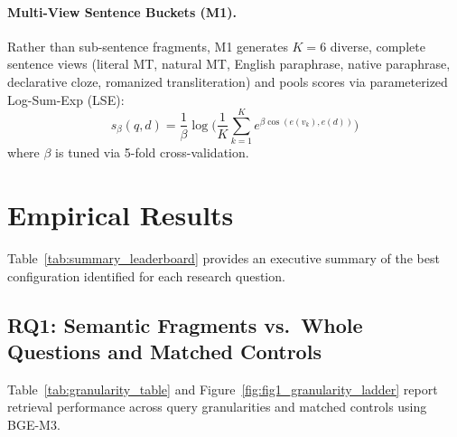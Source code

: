 \documentclass[11pt]{article}
\begin{document}
\paragraph{Multi-View Sentence Buckets (M1).} Rather than sub-sentence fragments, M1 generates $K=6$ diverse, complete sentence views (literal MT, natural MT, English paraphrase, native paraphrase, declarative cloze, romanized transliteration) and pools scores via parameterized Log-Sum-Exp (LSE):
\begin{equation}
s_\beta(q, d) = \frac{1}{\beta} \log \Big( \frac{1}{K} \sum_{k=1}^K e^{\beta \cos(e(v_k), e(d))} \Big)
\end{equation}
where $\beta$ is tuned via 5-fold cross-validation.

\section{Empirical Results}
\label{sec:results}

Table~\ref{tab:summary_leaderboard} provides an executive summary of the best configuration identified for each research question.

\subsection{RQ1: Semantic Fragments vs.\ Whole Questions and Matched Controls}
\label{sec:rq1_results}

Table~\ref{tab:granularity_table} and Figure~\ref{fig:fig1_granularity_ladder} report retrieval performance across query granularities and matched controls using BGE-M3.
\end{document}
